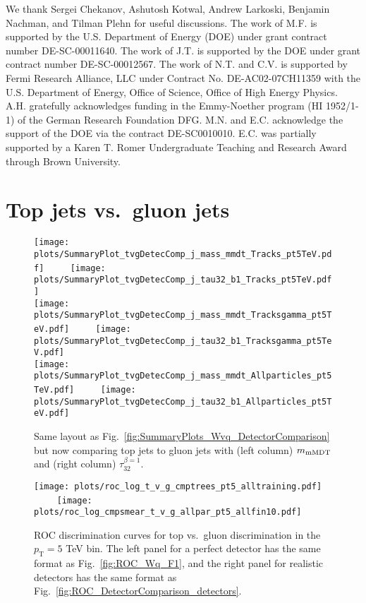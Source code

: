 \documentclass[11pt,letterpaper]{article}
\DeclareRobustCommand{\Fig}[1]{Fig.~\ref{#1}}
\newcommand{\pt}{p_{\mathrm{T}}}
\begin{document}
We thank Sergei Chekanov, Ashutosh Kotwal, Andrew Larkoski, Benjamin Nachman, and Tilman Plehn for useful discussions.  The work of M.F. is supported by the U.S. Department of Energy (DOE) under grant contract number DE-SC-00011640. The work of J.T. is supported by the DOE under grant contract number DE-SC-00012567.  The work of N.T. and C.V. is supported by Fermi Research Alliance, LLC under Contract No. DE-AC02-07CH11359 with the U.S. Department of Energy, Office of Science, Office of High Energy Physics. A.H. gratefully acknowledges funding in the Emmy-Noether program (HI 1952/1-1) of the German Research Foundation DFG. M.N. and E.C. acknowledge the support of the DOE via the contract DE-SC0010010. E.C. was partially supported by a Karen T. Romer Undergraduate Teaching and Research Award through Brown University.

\appendix
\section{Top jets vs.\ gluon jets}
\label{sec:appendix}

\begin{figure}[tp]
\begin{center}
\texttt{[image: plots/SummaryPlot\_tvgDetecComp\_j\_mass\_mmdt\_Tracks\_pt5TeV.pdf]}
$\qquad$
\texttt{[image: plots/SummaryPlot\_tvgDetecComp\_j\_tau32\_b1\_Tracks\_pt5TeV.pdf]} \\
\texttt{[image: plots/SummaryPlot\_tvgDetecComp\_j\_mass\_mmdt\_Tracksgamma\_pt5TeV.pdf]}
$\qquad$
\texttt{[image: plots/SummaryPlot\_tvgDetecComp\_j\_tau32\_b1\_Tracksgamma\_pt5TeV.pdf]} \\
\texttt{[image: plots/SummaryPlot\_tvgDetecComp\_j\_mass\_mmdt\_Allparticles\_pt5TeV.pdf]}
$\qquad$
\texttt{[image: plots/SummaryPlot\_tvgDetecComp\_j\_tau32\_b1\_Allparticles\_pt5TeV.pdf]}
\end{center}
\caption{Same layout as \Fig{fig:SummaryPlots_Wvq_DetectorComparison} but now comparing top jets to gluon jets with (left column) $m_{\rm mMDT}$ and (right column) $\tau_{32}^{\beta=1}$.}
\label{fig:SummaryPlots_gvt_DetecComparison}
\end{figure}

\begin{figure}[tp]
\begin{center}
\texttt{[image: plots/roc\_log\_t\_v\_g\_cmptrees\_pt5\_alltraining.pdf]}
$\qquad$
\texttt{[image: plots/roc\_log\_cmpsmear\_t\_v\_g\_allpar\_pt5\_allfin10.pdf]}
\end{center}
\caption{ROC discrimination curves for top vs.~gluon discrimination in the $\pt = 5$ TeV bin.  The left panel for a perfect detector has the same format as \Fig{fig:ROC_Wq_F1}, and the right panel for realistic detectors has the same format as \Fig{fig:ROC_DetectorComparison_detectors}.}
\label{fig:SummaryPlots_gvt_ROCs}
\end{figure}
\end{document}
